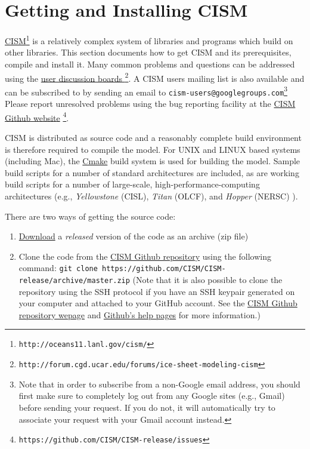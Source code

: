 
\section{Getting and Installing CISM}
\label{sec:getcode}

\href{http://oceans11.lanl.gov/cism/}{CISM}\footnote{\texttt{http://oceans11.lanl.gov/cism/}} is 
a relatively complex system of libraries and programs which build on other libraries. 
This section documents how to get CISM and its prerequisites, compile and install it. 
Many common problems and questions can be addressed using the 
\href{http://forum.cgd.ucar.edu/forums/ice-sheet-modeling-cism}{user discussion boards
\footnote{\texttt{http://forum.cgd.ucar.edu/forums/ice-sheet-modeling-cism}}}. 
A CISM users mailing list is also available and can be subscribed to by sending an email
to \texttt{cism-users@googlegroups.com}\footnote{Note that in order to subscribe from a non-Google email
address, you should first make sure to completely log out from any Google sites (e.g., Gmail) before sending 
your request. If you do not, it will automatically try to associate your request with your Gmail account instead.}
Please report unresolved problems using the bug reporting facility at the 
\href{https://github.com/CISM/CISM-release/issues}{CISM Github website}
\footnote{\texttt{https://github.com/CISM/CISM-release/issues}}. 

CISM is distributed as source code and a reasonably complete build environment is therefore required to compile the model. 
For UNIX and LINUX based systems (including Mac), the \href{http://www.cmake.org/}{Cmake} build system is used for building the model. 
Sample build scripts for a number of standard architectures are included, as are working build scripts 
for a number of large-scale, high-performance-computing architectures 
(e.g., \textit{Yellowstone} (CISL), \textit{Titan} (OLCF), and \textit{Hopper} (NERSC) ). 

There are two ways of getting the source code:

\begin{enumerate}

\item \href{https://github.com/CISM/CISM-release/archive/master.zip}{Download} a {\it released} version of the code as an archive (zip file) 

\item Clone the code from the \href{https://github.com/CISM/CISM-release}{CISM Github repository} using the following command: 
\texttt{git clone https://github.com/CISM/CISM-release/archive/master.zip}  
(Note that it is also possible to clone the repository using the SSH protocol 
if you have an SSH keypair generated on your computer and attached to your GitHub account.  
See the \href{https://github.com/CISM/CISM-release}{CISM Github repository wepage} and 
\href{https://help.github.com/articles/which-remote-url-should-i-use}{Github's help pages} for more information.)

\end{enumerate}

